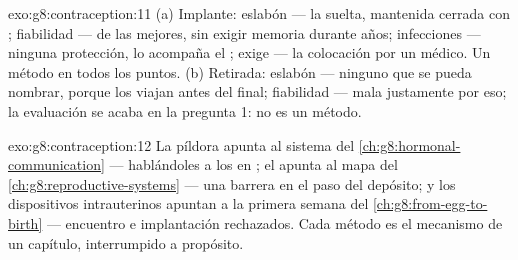 \begin{solution}{exo:g8:contraception:11}
(a) Implante: eslabón --- la suelta, mantenida cerrada con ;
fiabilidad --- de las mejores, sin exigir memoria durante años;
infecciones --- ninguna protección, lo acompaña el ; exige
--- la colocación por un médico. Un método en todos los puntos. (b)
Retirada: eslabón --- ninguno que se pueda nombrar, porque los
 viajan antes del final; fiabilidad --- mala justamente
por eso; la evaluación se acaba en la pregunta 1: no es un método.
\end{solution}

\begin{solution}{exo:g8:contraception:12}
La píldora apunta al sistema del
\cref{ch:g8:hormonal-communication} --- hablándoles a los  en
; el  apunta al mapa del
\cref{ch:g8:reproductive-systems} --- una barrera en el paso del
depósito; y los dispositivos intrauterinos apuntan a la primera semana
del \cref{ch:g8:from-egg-to-birth} --- encuentro e implantación
rechazados. Cada método es el mecanismo de un capítulo, interrumpido a
propósito.
\end{solution}

